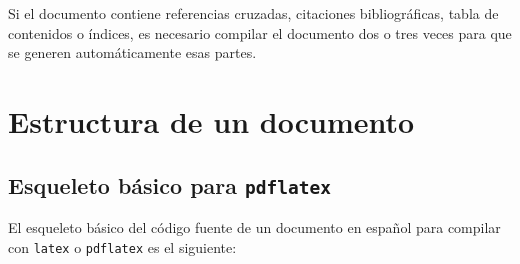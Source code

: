 \documentclass[
  spanish,
  a4paper,
]{scrreport}
\theoremstyle{definition}
\theoremstyle{remark}
\begin{document}
\begin{tcolorbox}[enhanced jigsaw, arc=.35mm, bottomrule=.15mm, bottomtitle=1mm, breakable, colback=white, colbacktitle=quarto-callout-warning-color!10!white, colframe=quarto-callout-warning-color-frame, coltitle=black, left=2mm, leftrule=.75mm, opacityback=0, opacitybacktitle=0.6, rightrule=.15mm, title=\textcolor{quarto-callout-warning-color}{\faExclamationTriangle}\hspace{0.5em}{Advertencia}, titlerule=0mm, toprule=.15mm, toptitle=1mm]

Si el documento contiene referencias cruzadas, citaciones
bibliográficas, tabla de contenidos o índices, es necesario compilar el
documento dos o tres veces para que se generen automáticamente esas
partes.

\end{tcolorbox}


\chapter{Estructura de un documento}\label{estructura-de-un-documento}

\section{\texorpdfstring{Esqueleto básico para
\texttt{pdflatex}}{Esqueleto básico para pdflatex}}\label{esqueleto-buxe1sico-para-pdflatex}

El esqueleto básico del código fuente de un documento en español para
compilar con \texttt{latex} o \texttt{pdflatex} es el siguiente:
\end{document}
